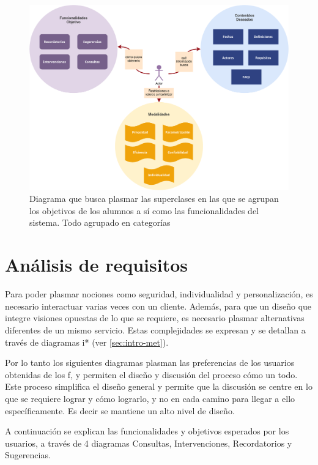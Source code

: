     \begin{figure}[h!]
        \centering
        \includegraphics[scale=0.4]{media/imagenes/focus_groups/objetivos_y_cualidades.png}
        \caption{Diagrama que busca plasmar las superclases en las que se agrupan los objetivos de los alumnos a sí como las funcionalidades del sistema. Todo agrupado en categorías}
        \label{fig:my_label}
    \end{figure}

\section{Análisis de requisitos}
        \par Para poder plasmar nociones como seguridad, individualidad y personalización, es necesario interactuar varias veces con un cliente. Además, para que un diseño que integre visiones opuestas de lo que se requiere, es necesario plasmar alternativas diferentes de un mismo servicio. Estas complejidades se expresan y se detallan a través de diagramas i* (ver \ref{sec:intro-met}).
        \par Por lo tanto los siguientes diagramas plasman las preferencias de los usuarios obtenidas de los \acrlong{f}, y permiten el diseño y discusión del proceso cómo un todo. Este proceso simplifica el diseño general y permite que la discusión se centre en lo que se requiere lograr y cómo lograrlo, y no en cada camino para llegar a ello específicamente. Es decir se mantiene un alto nivel de diseño.
        \par A continuación se explican las funcionalidades y objetivos esperados por los usuarios, a través de 4 diagramas Consultas, Intervenciones, Recordatorios y Sugerencias.
    
